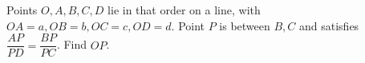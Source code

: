 Points $O,A,B,C,D$ lie in that order on a line, with $OA=a,OB=b,OC=c,OD=d$. Point $P$ is between $B,C$ and satisfies $\dfrac{AP}{PD}=\dfrac{BP}{PC}$. Find $OP$.
